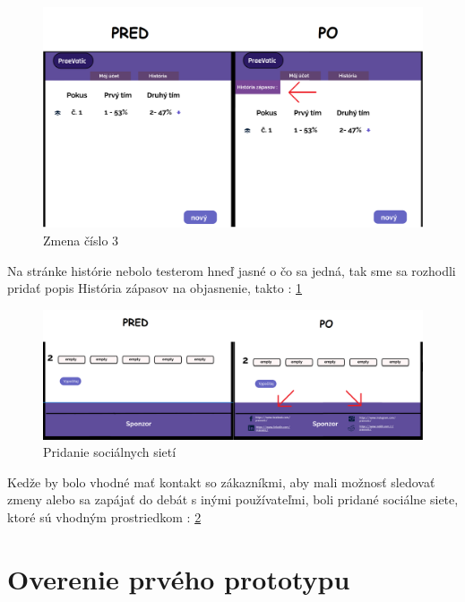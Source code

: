 \begin{figure}[h!]
	
	\includegraphics[width=.9\textwidth]{figures/3}
	
	\centering
	
	\caption{ Zmena číslo 3 \label{3}}
	
\end{figure}

Na stránke histórie nebolo testerom hneď jasné o čo sa jedná, tak sme sa rozhodli pridať popis História zápasov na objasnenie, takto : \ref{3}
\\



\begin{figure}[h!]
	
	\includegraphics[width=.9\textwidth]{figures/4}
	
	\centering
	
	\caption{ Pridanie sociálnych sietí \label{4}}
	
\end{figure}

Kedže by bolo vhodné mať kontakt so zákazníkmi, aby mali možnosť sledovať zmeny alebo sa zapájať do debát s inými používateľmi, boli pridané sociálne siete, ktoré sú vhodným prostriedkom : \ref{4}





\section*{Overenie prvého prototypu}



